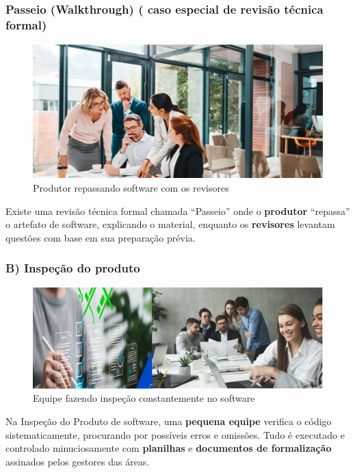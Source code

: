 \documentclass[
]{book}
\begin{document}
\subsubsection{Passeio (Walkthrough) ( caso especial de revisão técnica formal)}\label{passeio-walkthrough-caso-especial-de-revisuxe3o-tuxe9cnica-formal}

\begin{figure}
\centering
\includegraphics{images/passeio.jpg}
\caption{Produtor repassando software com os revisores}
\end{figure}

Existe uma revisão técnica formal chamada ``Passeio'' onde o \textbf{produtor} ``repassa'' o artefato de software, explicando o material, enquanto os \textbf{revisores} levantam questões com base em sua preparação prévia.

\subsubsection{B) Inspeção do produto}\label{b-inspeuxe7uxe3o-do-produto}

\begin{figure}
\centering
\includegraphics{images/inspecao.jpg}
\caption{Equipe fazendo inspeção constantemente no software}
\end{figure}

Na Inspeção do Produto de software, uma \textbf{pequena equipe} verifica o código sistematicamente, procurando por possíveis erros e omissões. Tudo é executado e controlado minuciosamente com \textbf{planilhas} e \textbf{documentos de formalização} assinados pelos gestores das áreas.
\end{document}
